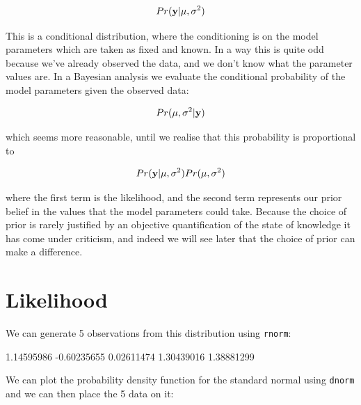\documentclass{article}
\begin{document}
\begin{displaymath}
Pr({\bf y} | \mu, \sigma^{2})
\end{displaymath}

This is a conditional distribution, where the conditioning is on the model parameters which are taken as fixed and known. In a way this is quite odd because we've already observed the data, and we don't know what the parameter values are. In a Bayesian analysis we evaluate the conditional probability of the model parameters given the observed data:

\begin{displaymath}
Pr(\mu, \sigma^{2} | {\bf y})
\label{post1-eq}
\end{displaymath}
 
which seems more reasonable, until we realise that this probability is proportional to 

\begin{displaymath}
Pr({\bf y} | \mu, \sigma^{2})Pr(\mu, \sigma^{2})
\end{displaymath}

where the first term is the likelihood, and the second term represents our prior belief in the values that the model parameters could take. Because the choice of prior is rarely justified by an objective quantification of the state of knowledge it has come under criticism, and indeed we will see later that the choice of prior can make a difference. 

\section{Likelihood}

We can generate 5 observations from this distribution using \texttt{rnorm}:

\begin{Schunk}
\begin{Soutput}
[1]  1.14595986 -0.60235655  0.02611474  1.30439016  1.38881299
\end{Soutput}
\end{Schunk}

We can plot the probability density function for the standard normal using \texttt{dnorm} and we can then place the 5 data on it:
\end{document}
